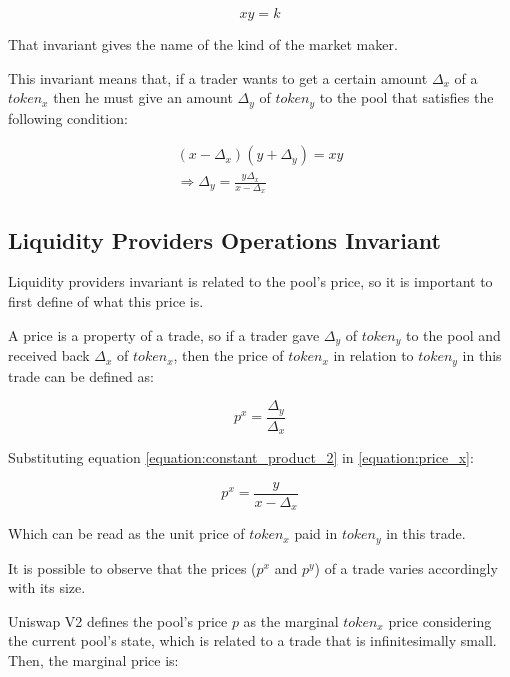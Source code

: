 \documentclass{article}
\begin{document}
\begin{equation}
    \label{equation:constant_product}
    xy=k
\end{equation}

That invariant gives the name of the kind of the market maker.

This invariant means that, if a trader wants to get a certain amount $\Delta_x$ of a $token_x$ then he must give an amount $\Delta_y$ of $token_y$ to the pool that satisfies the following condition:

\begin{equation}
    \label{equation:constant_product_2}
    \begin{split}
        (x - \Delta_x)(y + \Delta_y)=xy \\
        \Rightarrow \Delta_y=\frac{y\Delta_x}{x - \Delta_x}
    \end{split}
\end{equation}

\subsection{Liquidity Providers Operations Invariant}
\label{section:liquidity_providers_invariant}

Liquidity providers invariant is related to the pool's price, so it is important to first define of what this price is.

A price is a property of a trade, so if a trader gave $\Delta_y$ of $token_y$ to the pool and received back $\Delta_x$ of $token_x$, then the price of $token_x$ in relation to $token_y$ in this trade can be defined as:

\begin{equation}
    \label{equation:price_x}
    p^x=\frac{\Delta_y}{\Delta_x}
\end{equation}

Substituting equation \ref{equation:constant_product_2} in \ref{equation:price_x}:

\begin{equation}
    \label{equation:price_x_2}
    p^x=\frac{y}{x-\Delta_x}
\end{equation}

Which can be read as the unit price of $token_x$ paid in $token_y$ in this trade.

It is possible to observe that the prices ($p^x$ and $p^y$) of a trade varies accordingly with its size.

Uniswap V2 defines the pool's price $p$ as the marginal $token_x$ price considering the current pool's state, which is related to a trade that is infinitesimally small.
Then, the marginal price is:
\end{document}
